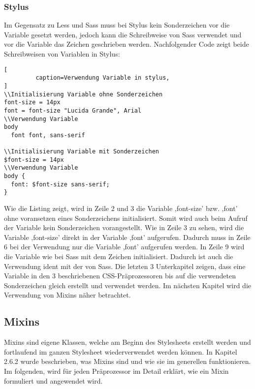 \subsubsection{Stylus}
Im Gegensatz zu Less und Sass muss bei Stylus kein Sonderzeichen vor die Variable gesetzt werden, jedoch kann die Schreibweise von Sass verwendet und vor die Variable das Zeichen \glqq{\$}\grqq{} geschrieben werden. Nachfolgender Code zeigt beide Schreibweisen von Variablen in Stylus:
\begin{lstlisting}[
         caption=Verwendung Variable in stylus,
]
\\Initialisierung Variable ohne Sonderzeichen
font-size = 14px
font = font-size "Lucida Grande", Arial
\\Verwendung Variable
body
  font font, sans-serif

\\Initialisierung Variable mit Sonderzeichen
$font-size = 14px
\\Verwendung Variable
body {
  font: $font-size sans-serif;
}
\end{lstlisting}
Wie die Listing zeigt, wird in Zeile 2 und 3 die Variable ,font-size' bzw. ,font' ohne voransetzen eines Sonderzeichens initialisiert. Somit wird auch beim Aufruf der Variable kein Sonderzeichen vorangestellt. Wie in Zeile 3 zu sehen, wird die Variable ,font-size' direkt in der Variable ,font' aufgerufen. Dadurch muss in Zeile 6 bei der Verwendung nur die Variable ,font' aufgerufen werden.\newline
In Zeile 9 wird die Variable wie bei Sass mit dem Zeichen \glqq{\$}\grqq{} initialisiert. Dadurch ist auch die Verwendung ident mit der von Sass.\newline\newline
Die letzten 3 Unterkapitel zeigen, dass eine Variable in den 3 beschriebenen CSS-Präprozessoren bis auf die verwendeten Sonderzeichen gleich erstellt und verwendet werden.\newline
Im nächsten Kapitel wird die Verwendung von Mixins näher betrachtet.
\newpage
\subsection{Mixins}
Mixins sind eigene Klassen, welche am Beginn des Stylesheets erstellt werden und fortlaufend im ganzen Stylesheet wiederverwendet werden können. \newline
In Kapitel 2.6.2 wurde beschrieben, was Mixins sind und wie sie im generellen funktionieren. Im folgenden, wird für jeden Präprozessor im Detail erklärt, wie ein Mixin formuliert und angewendet wird.
